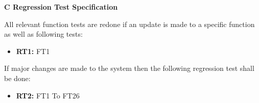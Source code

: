 \documentclass{article}
\begin{document}
		\newpage
		\begin{flushleft}
		{\large \textbf{C Regression Test Specification}}
		\end{flushleft}
			
		\begin{flushleft}
		All relevant function tests are redone if an update is made to a specific function as well as following tests:
		\end{flushleft}
		
		\begin{itemize}
		
  			\item \textbf{RT1:} FT1
  			
			  					
		\end{itemize}
		
		\begin{flushleft}
			If major changes are made to the system then the following regression test shall be done:
			\end{flushleft}	
		
		\begin{itemize}			
  			
  			\item \textbf{RT2:} FT1 To FT26			

		\end{itemize}
		
		
			
		


\end{document}
